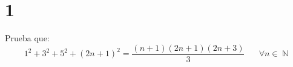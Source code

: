 \documentclass[12pt, fleqn]{article}                            %
\DeclareMathOperator \Space     {\quad}                         %
\theoremstyle{break}                                            %
\DeclareMathOperator \Naturals     {\mathbb{N}}                 %
\begin{document}
\restoregeometry                                                    %
\nopagecolor                                                        %




\tableofcontents{}
\label{sec:Index}

\clearpage

\clearpage
\section{1}

    Prueba que:
    \begin{equation*}
        1^2 + 3^2 + 5^2 + (2n + 1)^2 = \dfrac{(n+1)(2n+1)(2n+3)}{3} \Space \forall n \in \Naturals 
    \end{equation*}
\end{document}
